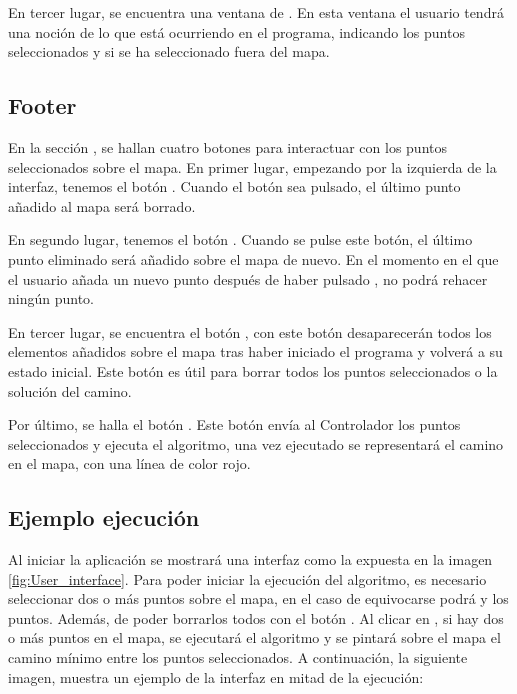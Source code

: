 En tercer lugar, se encuentra una ventana de . En esta ventana el usuario tendrá una noción de lo que está ocurriendo en el programa, indicando los puntos seleccionados y si se ha seleccionado fuera del mapa. \bigskip

\subsection{Footer}\label{Footer}

En la sección , se hallan cuatro botones para interactuar con los puntos seleccionados sobre el mapa.
En primer lugar, empezando por la izquierda de la interfaz, tenemos el botón . Cuando el botón sea pulsado, el último punto añadido al mapa será borrado.\bigskip

En segundo lugar, tenemos el botón . Cuando se pulse este botón, el último punto eliminado será añadido sobre el mapa de nuevo. En el momento en el que el usuario añada un nuevo punto después de haber pulsado , no podrá rehacer ningún punto.\bigskip 

En tercer lugar, se encuentra el botón , con este botón desaparecerán todos los elementos añadidos sobre el mapa tras haber iniciado el programa y volverá a su estado inicial. Este botón es útil para borrar todos los puntos seleccionados o la solución del camino.\bigskip

Por último, se halla el botón . Este botón envía al Controlador los puntos seleccionados y ejecuta el algoritmo, una vez ejecutado se representará el camino en el mapa, con una línea de color rojo. 

\subsection{Ejemplo ejecución}

Al iniciar la aplicación se mostrará una interfaz como la expuesta en la imagen \ref{fig:User_interface}. Para poder iniciar la ejecución del algoritmo, es necesario seleccionar dos o más puntos sobre el mapa, en el caso de equivocarse podrá  y  los puntos. Además, de poder borrarlos todos con el botón . Al clicar en , si hay dos o más puntos en el mapa, se ejecutará el algoritmo y se pintará sobre el mapa el camino mínimo entre los puntos seleccionados. A continuación, la siguiente imagen, muestra un ejemplo de la interfaz en mitad de la ejecución:

